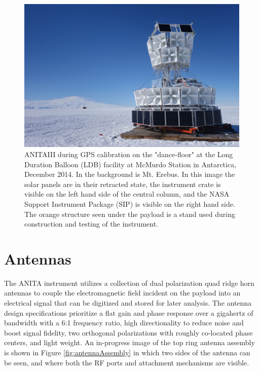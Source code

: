 \begin{figure}
\centering
	\includegraphics[width=\textwidth]{figures/ANITA3_dancefloor}
	\caption{ANITAIII during GPS calibration on the "dance-floor" at the Long Duration Balloon (LDB) facility at McMurdo Station in Antarctica, December 2014.  In the background is Mt. Erebus.  In this image the solar panels are in their retracted state, the instrument crate is visible on the left hand side of the central column, and the NASA Support Instrument Package (SIP) is visible on the right hand side. The orange structure seen under the payload is a stand used during construction and testing of the instrument.}
	\label{fig:ANITA3_dancefloor}
\end{figure}



	
\section{Antennas}
	The ANITA instrument utilizes a collection of dual polarization quad ridge horn antennas to couple the electromagnetic field incident on the payload into an electrical signal that can be digitized and stored for later analysis.  The antenna design specifications prioritize a flat gain and phase response over a gigahertz of bandwidth with a 6:1 frequency ratio, high directionality to reduce noise and boost signal fidelity, two orthogonal polarizations with roughly co-located phase centers, and light weight. 	An in-progress image of the top ring antenna assembly is shown in Figure \ref{fig:antennaAssembly} in which two sides of the antenna can be seen, and where both the RF ports and attachment mechanisms are visible.
	
